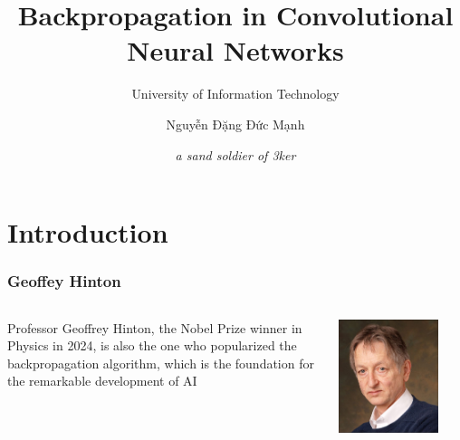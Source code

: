 \documentclass{beamer}
\title{Backpropagation in Convolutional \\Neural Networks}
\subtitle{University of Information Technology}
\author{Nguyễn Đặng Đức Mạnh}
\date{\textit{a sand soldier of 3ker}}
\begin{document}
    \maketitle
	
    \section{Introduction}
    
    \begin{frame}
    	\frametitle{Geoffey Hinton}
    	
    	\begin{columns}
    		\centering
    		\justify
    		Professor Geoffrey Hinton, the Nobel Prize winner in Physics in 2024, is also the one who popularized the backpropagation algorithm, which is the foundation for the remarkable development of AI
    		
    		\begin{flushright}
    			\includegraphics[width=0.8\textwidth]{src/hinton}
    		\end{flushright}
    	\end{columns}
    \end{frame}
    
\end{document}
